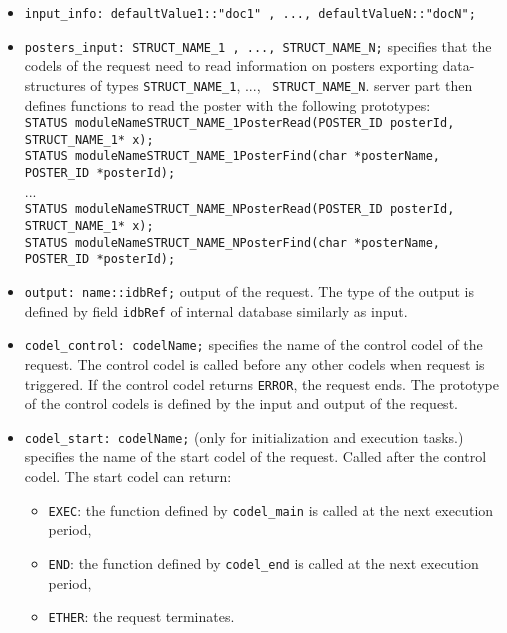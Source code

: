 \begin{itemize}
\item[]\texttt{input\_info:  defaultValue1::"doc1" , ..., defaultValueN::"docN";}
\item[]\texttt{posters\_input:  STRUCT\_NAME\_1 , ..., STRUCT\_NAME\_N;}
specifies that the codels of the request need to read information on posters exporting
data-structures of types \texttt{STRUCT\_NAME\_1}, ...,
\texttt{  STRUCT\_NAME\_N}. {\GenoM} server part then defines functions to read
the poster with the following prototypes:\\{\small
\texttt{STATUS moduleNameSTRUCT\_NAME\_1PosterRead(POSTER\_ID posterId,
  STRUCT\_NAME\_1* x);}\\
\texttt{STATUS moduleNameSTRUCT\_NAME\_1PosterFind(char *posterName,
  POSTER\_ID *posterId);}\\
...\\
\texttt{STATUS moduleNameSTRUCT\_NAME\_NPosterRead(POSTER\_ID posterId,
  STRUCT\_NAME\_1* x);}\\
\texttt{STATUS moduleNameSTRUCT\_NAME\_NPosterFind(char *posterName,
  POSTER\_ID *posterId);}\\
}
\item[]\texttt{output:  name::idbRef;} output of the request. The type of
the output is defined by field \texttt{idbRef} of internal database
similarly as input.\\

\item[]\texttt{codel\_control: codelName;} specifies the name of the
control codel of the request. The control codel is called before
any other codels when request is triggered. If the control codel returns \texttt{ERROR}, the
request ends. The prototype of the control codels is defined by the
input and output of the request.

\item[]\texttt{codel\_start: codelName;} (only for initialization and execution
tasks.) specifies the name of the start codel of the request. Called
after the control codel. The start codel can return:
\begin{itemize}
\item \texttt{EXEC}: the function defined by \texttt{codel\_main} is called
  at the next execution period,
\item \texttt{END}: the function defined by \texttt{codel\_end} is called at the
  next execution period,
\item \texttt{ETHER}: the request terminates.
\end{itemize}


\end{itemize}
